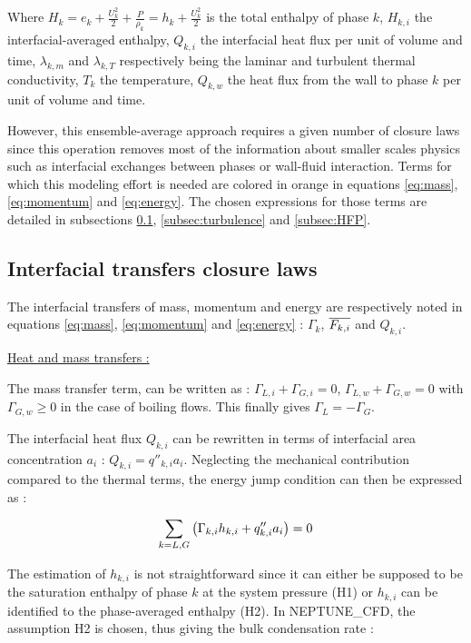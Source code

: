 Where $H_{k}=e_{k}+\frac{U_{k}^{2}}{2}+\frac{P}{\rho_{k}}=h_{k}+\frac{U_{k}^{2}}{2}$ is the total enthalpy of phase $k$, $H_{k,i}$ the interfacial-averaged enthalpy, $Q_{k,i}$ the interfacial heat flux per unit of volume and time, $\lambda_{k,m}$ and $\lambda_{k,T}$ respectively being the laminar and turbulent thermal conductivity, $T_{k}$ the temperature, $Q_{k,w}$ the heat flux from the wall to phase $k$ per unit of volume and time.


However, this ensemble-average approach requires a given number of closure laws since this operation removes most of the information about smaller scales physics such as interfacial exchanges between phases or wall-fluid interaction. Terms for which this modeling effort is needed are colored in orange in equations \ref{eq:mass}, \ref{eq:momentum} and \ref{eq:energy}. The chosen expressions for those terms are detailed in subsections \ref{subsec:int_transfers}, \ref{subsec:turbulence} and \ref{subsec:HFP}.

\subsection{Interfacial transfers closure laws}
\label{subsec:int_transfers}

The interfacial transfers of mass, momentum and energy are respectively noted in equations \ref{eq:mass}, \ref{eq:momentum} and \ref{eq:energy} : $\Gamma_{k}$, $\overline{F_{k,i}}$ and $Q_{k,i}$.

\underline{Heat and mass transfers :}


The mass transfer term, can be written as : $\Gamma_{L,i} + \Gamma_{G,i} = 0$, $\Gamma_{L,w} + \Gamma_{G,w} = 0$ with $\Gamma_{G,w} \geq 0$ in the case of boiling flows. This finally gives $\Gamma_{L}=-\Gamma_{G}$.

The interfacial heat flux $Q_{k,i}$ can be rewritten in terms of interfacial area concentration $a_{i}$ : $Q_{k,i}=q''_{k,i}a_{i}$. Neglecting the mechanical contribution compared to the thermal terms, the energy jump condition can then be expressed as :

\begin{equation}
\label{eq:energy_jump}
\sum_{k=L,G}\left( \Gamma_{k,i}h_{k,i} + q''_{k,i}a_{i} \right)=0
\end{equation}

The estimation of $h_{k,i}$ is not straightforward since it can either be supposed to be the saturation enthalpy of phase $k$ at the system pressure (H1) or $h_{k,i}$ can be identified to the phase-averaged enthalpy (H2). In NEPTUNE\_CFD, the assumption H2 is chosen, thus giving the bulk condensation rate :


